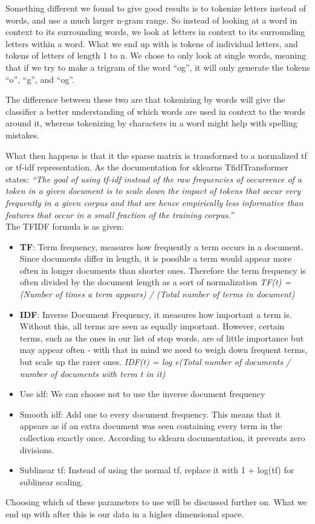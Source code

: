Something different we found to give good results is to tokenize letters instead of words, and use a much larger n-gram range. So instead of looking at a word in context to its surrounding words, we look at letters in context to its surrounding letters within a word. What we end up with is tokens of individual letters, and tokens of letters of length 1 to n. We chose to only look at single words, meaning that if we try to make a trigram of the word “og”, it will only generate the tokens “o”, “g”, and “og”.

The difference between these two are that tokenizing by words will give the classifier a better understanding of which words are used in context to the words around it, whereas tokenizing by characters in a word might help with spelling mistakes.

What then happens is that it the sparse matrix is transformed to a normalized tf or tf-idf representation.
As the documentation for sklearns TfidfTransformer states:
\textit{“The goal of using tf-idf instead of the raw frequencies of occurrence of a token in a given document is to scale down the impact of tokens that occur very frequently in a given corpus and that are hence empirically less informative than features that occur in a small fraction of the training corpus.”} \cite{tfidf} \\
The TFIDF formula is as given:
\begin{itemize}
    \item \textbf{TF}: Term frequency, measures how frequently a term occurs in a document. Since documents differ in length, it is possible a term would appear more often in longer documents than shorter ones. Therefore the term frequency is often divided by the document length as a sort of normalization
    \textit{TF(t) = (Number of times a term appears) / (Total number of terms in document)}
    \item \textbf{IDF}: Inverse Document Frequency, it measures how important a term is. Without this, all terms are seen as equally important. However, certain terms, such as the ones in our list of stop words, are of little importance but may appear often - with that in mind we need to weigh down frequent terms, but scale up the rarer ones.
    \textit{IDF(t) = log e(Total number of documents / number of documents with term t in it)}
\end{itemize}

\begin{itemize}
    \item Use idf: We can choose not to use the inverse document frequency
    \item Smooth idf: Add one to every document frequency. This means that it appears as if an extra document was seen containing every term in the collection exactly once. According to sklearn documentation, it prevents zero divisions.
    \item Sublinear tf: Instead of using the normal tf, replace it with 1 + log(tf) for sublinear scaling.
\end{itemize}
Choosing which of these parameters to use will be discussed further on. What we end up with after this is our data in a higher dimensional space.

